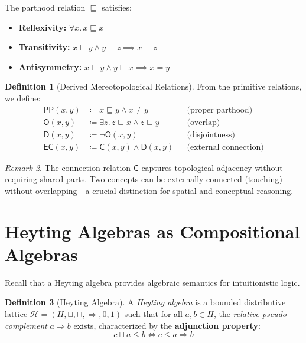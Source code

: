 \documentclass[12pt,a4paper]{article}
\theoremstyle{definition}
\newtheorem{definicao}{Definition}[section]
\theoremstyle{plain}
\theoremstyle{remark}
\newtheorem{observacao}[definicao]{Remark}
\newcommand{\defeq}{\coloneqq}
\begin{document}
The parthood relation $\sqsubseteq$ satisfies:
\begin{itemize}
    \item \textbf{Reflexivity:} $\forall x.\, x \sqsubseteq x$
    \item \textbf{Transitivity:} $x \sqsubseteq y \land y \sqsubseteq z \implies x \sqsubseteq z$
    \item \textbf{Antisymmetry:} $x \sqsubseteq y \land y \sqsubseteq x \implies x = y$
\end{itemize}

\begin{definicao}[Derived Mereotopological Relations]
From the primitive relations, we define:
\begin{align*}
    \mathsf{PP}(x, y) &\defeq x \sqsubseteq y \land x \neq y && \text{(proper parthood)} \\
    \mathsf{O}(x, y) &\defeq \exists z.\, z \sqsubseteq x \land z \sqsubseteq y && \text{(overlap)} \\
    \mathsf{D}(x, y) &\defeq \neg \mathsf{O}(x, y) && \text{(disjointness)} \\
    \mathsf{EC}(x, y) &\defeq \mathsf{C}(x, y) \land \mathsf{D}(x, y) && \text{(external connection)}
\end{align*}
\end{definicao}

\begin{observacao}
The connection relation $\mathsf{C}$ captures topological adjacency without requiring shared parts. Two concepts can be externally connected (touching) without overlapping---a crucial distinction for spatial and conceptual reasoning.
\end{observacao}

\section{Heyting Algebras as Compositional Algebras}

Recall that a Heyting algebra provides algebraic semantics for intuitionistic logic.

\begin{definicao}[Heyting Algebra]
A \emph{Heyting algebra} is a bounded distributive lattice $\mathcal{H} = (H, \sqcup, \sqcap, \Rightarrow, 0, 1)$ such that for all $a, b \in H$, the \emph{relative pseudo-complement} $a \Rightarrow b$ exists, characterized by the \textbf{adjunction property}:
$$
c \sqcap a \leq b \iff c \leq a \Rightarrow b
$$
\end{definicao}
\end{document}
